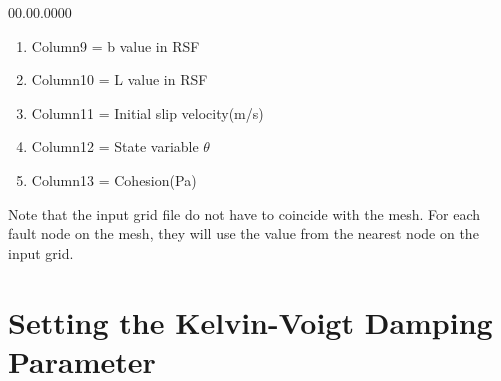 \begin{lyxlist}{00.00.0000}
\begin{enumerate}
  \item{Column9} = b value in RSF

  \item{Column10} = L value in RSF

  \item{Column11} = Initial slip velocity(m/s)

  \item{Column12} = State variable $\theta$

  \item{Column13} = Cohesion(Pa)
  \end{enumerate}
  Note that the input grid file do not have to coincide with the mesh. For each fault node on the mesh, they will use the value from the nearest node on the input grid.
\end{lyxlist}


\section{Setting the Kelvin-Voigt Damping Parameter}\label{sec:Setting-the-Kelvin-Voigt}

